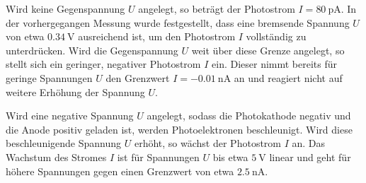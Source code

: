 Wird keine Gegenspannung $U$ angelegt, so beträgt der Photostrom $I = \SI{80}{\pico\ampere}$.
In der vorhergegangen Messung wurde festgestellt, dass eine bremsende Spannung $U$ von etwa $\SI{0.34}{\volt}$ 
ausreichend ist, um den Photostrom $I$ vollständig zu unterdrücken.
Wird die Gegenspannung $U$ weit über diese Grenze angelegt, so stellt sich ein geringer, negativer Photostrom $I$ ein.
Dieser nimmt bereits für geringe Spannungen $U$ den Grenzwert $I=\SI{-0.01}{\nano\ampere}$ an und reagiert nicht auf weitere Erhöhung der Spannung $U$.

Wird eine negative Spannung $U$ angelegt, sodass die Photokathode negativ und die Anode positiv geladen ist, 
werden Photoelektronen beschleunigt.
Wird diese beschleunigende Spannung $U$ erhöht, so wächst der Photostrom $I$ an. 
Das Wachstum des Stromes $I$ ist für Spannungen $U$ bis etwa $\SI{5}{\volt}$ linear und geht für höhere Spannungen gegen einen Grenzwert von etwa $\SI{2.5}{\nano\ampere}$.